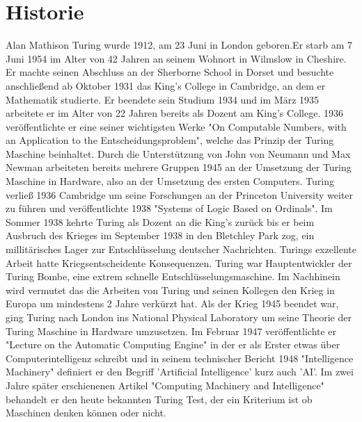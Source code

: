 \section{Historie}
Alan Mathison Turing wurde 1912, am 23 Juni in London geboren.Er starb am 7 Juni 1954 im Alter von 42 Jahren an seinem Wohnort in Wilmslow in Cheshire. Er machte seinen Abschluss an der Sherborne School in Dorset und besuchte anschließend ab Oktober 1931 das King's College in Cambridge, an dem er Mathematik studierte. Er beendete sein Studium 1934 und im März 1935 arbeitete er im Alter von 22 Jahren bereits als Dozent am King's College. 1936 veröffentlichte er eine seiner wichtigsten Werke "On Computable Numbers, with an Application to the Entscheidungsproblem", welche das Prinzip der Turing Maschine beinhaltet. Durch die Unterstützung von John von Neumann und Max Newman arbeiteten bereits mehrere Gruppen 1945 an der Umsetzung der Turing Maschine in Hardware, also an der Umsetzung des ersten Computers. Turing verließ 1936 Cambridge um seine Forschungen an der Princeton University weiter zu führen und veröffentlichte 1938 "Systems of Logic Based on Ordinals". 
Im Sommer 1938 kehrte Turing als Dozent an die King's zurück bis er beim Ausbruch des Krieges im September 1938 in den Bletchley Park zog, ein millitärisches Lager zur Entschlüsselung deutscher Nachrichten. Turings exzellente Arbeit hatte Kriegsentscheidente Konsequenzen. Turing war Hauptentwickler der Turing Bombe, eine extrem schnelle Entschlüsselungsmaschine. Im Nachhinein wird vermutet das die Arbeiten von Turing und seinen Kollegen den Krieg in Europa um mindestens 2 Jahre verkürzt hat.
Als der Krieg 1945 beendet war, ging Turing nach London ins National Physical Laboratory um seine Theorie der Turing Maschine in Hardware umzusetzen. Im Februar 1947 veröffentlichte er "Lecture on the Automatic Computing Engine" in der er als Erster etwas über Computerintelligenz schreibt und in seinem technischer Bericht 1948 "Intelligence Machinery" definiert er den Begriff 'Artificial Intelligence' kurz auch 'AI'. Im zwei Jahre später erschienenen Artikel "Computing Machinery and Intelligence" behandelt er den heute bekannten Turing Test, der ein Kriterium ist ob Maschinen denken können oder nicht.